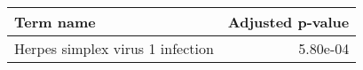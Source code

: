 \begin{tabular}{lr}
\toprule
                        Term name &  Adjusted p-value \\
\midrule
 Herpes simplex virus 1 infection &          5.80e-04 \\
\bottomrule
\end{tabular}
